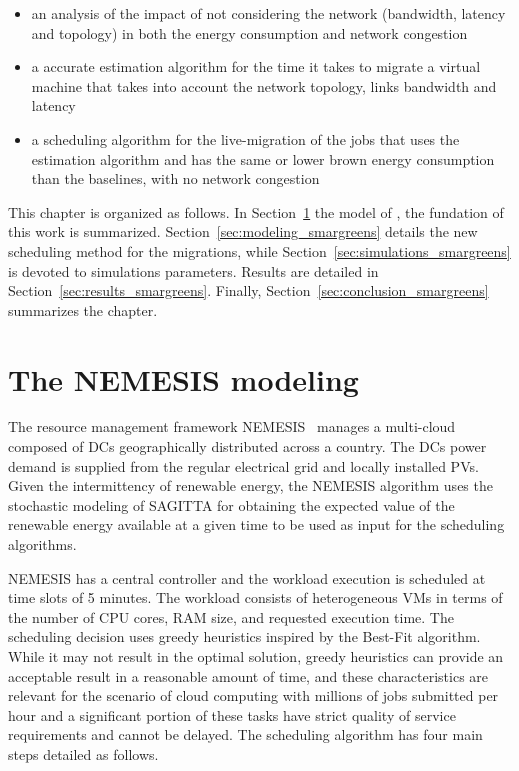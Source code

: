 \begin{itemize}
    \item an analysis of the impact of not considering the network (bandwidth, latency and topology) in both the energy consumption and network congestion
    \item a accurate estimation algorithm for the time it takes to migrate a virtual machine that takes into account the network topology, links bandwidth and latency
    \item a scheduling algorithm for the live-migration of the jobs that uses the estimation algorithm and has the same or lower brown energy consumption than the baselines, with no network congestion
\end{itemize}

This chapter is organized as follows. In Section~\ref{sec:nemesis} the model of \cite{NEMESIS}, the fundation of this work is summarized. Section~\ref{sec:modeling_smargreens} details the new scheduling method for the migrations, while Section~\ref{sec:simulations_smargreens} is devoted to simulations parameters. Results are detailed in Section~\ref{sec:results_smargreens}. Finally, Section~\ref{sec:conclusion_smargreens} summarizes the chapter.


\section{The NEMESIS modeling}
\label{sec:nemesis}

The resource management framework NEMESIS~\cite{NEMESIS} manages a multi-cloud composed of DCs geographically
distributed across a country. The DCs power demand is supplied from
the regular electrical grid and locally installed PVs. Given the
intermittency of renewable energy, the NEMESIS algorithm uses the
stochastic modeling of SAGITTA \cite{SAGITTA} for obtaining the
expected value of the renewable energy available at a given time to be
used as input for the scheduling algorithms.

NEMESIS has a central controller and the workload execution is scheduled at time slots of 5 minutes. The workload consists of heterogeneous VMs in terms of the number of CPU cores, RAM size, and requested execution time. The scheduling decision uses greedy heuristics inspired by the Best-Fit algorithm. While it may not result in the optimal solution, greedy heuristics can provide an acceptable result in a reasonable amount of time, and these characteristics are relevant for the scenario of cloud computing with millions of jobs submitted per hour and a significant portion of these tasks have strict quality of service requirements and cannot be delayed.  The scheduling algorithm has four main steps detailed as follows. 

